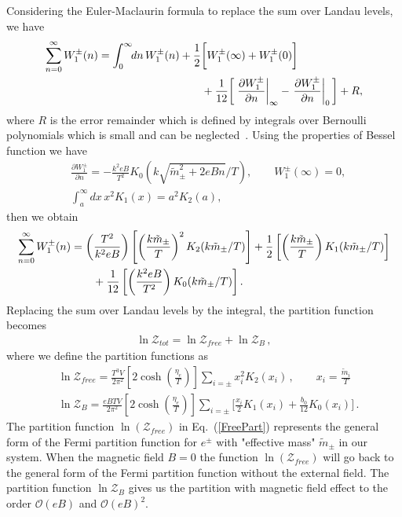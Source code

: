 Considering the Euler-Maclaurin formula to replace the sum over Landau levels, we have 
\begin{align}
\sum^{\infty}_{n=0}W^\pm_1(n)=\int^\infty_0\!\!dn\,W^\pm_1(n)&+\frac{1}{2}\bigg[W^\pm_1(\infty)+W^\pm_1(0)\bigg]\notag\\
&\qquad+\frac{1}{12}\bigg[\left.\frac{\partial W^\pm_1}{\partial n}\right|_{\infty}-\left.\frac{\partial W^\pm_1}{\partial n}\right|_{0}\bigg]+R,
\end{align}
where $R$ is the error remainder which is defined by integrals over Bernoulli polynomials which is small and can be neglected~\cite{Elze:1980er}. Using the properties of Bessel function we have
\begin{align}
&\frac{\partial W^\pm_1}{\partial n}=-\frac{k^2eB}{T^2}K_0\left({k\sqrt{\tilde{m}^2_\pm+2eBn}}/{T}\right),\qquad W^\pm_1(\infty)=0,\\
&\int^\infty_a\!\!dx\,x^2K_1(x)=a^2K_2(a),
\end{align}
then we obtain
\begin{align}
\sum^{\infty}_{n=0}W^\pm_1(n)
&=\left(\frac{T^2}{k^2eB}\right)\left[\left(\frac{k\tilde{m}_\pm}{T}\right)^2K_2(k\tilde m_\pm/T)\right]+\frac{1}{2}\left[\left(\frac{k\tilde{m}_\pm}{T}\right)K_1(k\tilde m_\pm/T)\right]\notag\\
&\qquad+\frac{1}{12}\left[\left(\frac{k^2eB}{T^2}\right)K_0(k\tilde m_\pm/T)\right].
\end{align}
Replacing the sum over Landau levels by the integral, the partition function becomes
\begin{align}
\ln\mathcal{Z}_{tot}=\ln\mathcal{Z}_{free}+\ln\mathcal{Z}_B\,,
\end{align}
where we define the partition functions as  
\begin{align}
 \label{FreePart}&\ln\mathcal{Z}_{free}=\frac{T^3V}{2\pi^2}\left[2\cosh{\left(\frac{\eta_{e}}{T}\right)}\right]\sum_{i=\pm}x_i^2K_2\left(x_i\right)\,,\qquad x_i=\frac{\tilde{m}_i}{T}\\
 \label{MagPart}&\ln\mathcal{Z}_B=\frac{eBTV}{2\pi^2}\left[2\cosh{\left(\frac{\eta_{e}}{T}\right)}\right]\sum_{i=\pm}\bigg[\frac{x_i}{2}K_1\left(x_i\right)+\frac{b_0}{12}K_0\left(x_i\right)\bigg]\,.
\end{align}
The partition function $\ln(\mathcal{Z}_{free})$ in Eq.~(\ref{FreePart}) represents the general form of the Fermi partition function for $e^\pm$ with "effective mass" $\tilde{m}_\pm$ in our system. When the magnetic field $B=0$ the function $\ln(\mathcal{Z}_{free})$ will go back to the general form of the Fermi partition function without the external field. The partition function $\ln\mathcal{Z}_B$ gives us the partition with magnetic field effect to the order  $\mathcal{O}(eB)$ and  $\mathcal{O}(eB)^2$.


